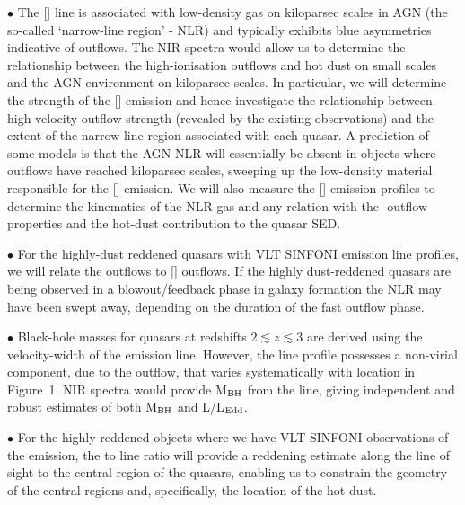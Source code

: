 \vspace{1.5mm}

$\bullet$ The [] line is associated with low-density gas on
kiloparsec scales in AGN (the so-called `narrow-line region' - NLR)
and typically exhibits blue asymmetries indicative of outflows. The
NIR spectra would allow us to determine the relationship between the
high-ionisation outflows and hot dust on small scales and the AGN
environment on kiloparsec scales. In particular, we will determine the
strength of the [] emission and hence investigate the
relationship between high-velocity outflow strength (revealed by the
existing  observations) and the extent of the narrow line
region associated with each quasar. A prediction of some models is
that the AGN NLR will essentially be absent in objects where outflows
have reached kiloparsec scales, sweeping up the low-density material
responsible for the []-emission. We will also measure the
[] emission profiles to determine the kinematics of the NLR
gas and any relation with the -outflow properties and the
hot-dust contribution to the quasar SED.

$\bullet$ For the highly-dust reddened quasars with VLT SINFONI
\ha emission line profiles, we will relate the \ha
outflows to [] outflows. If the highly dust-reddened quasars
are being observed in a blowout/feedback phase in galaxy formation the
NLR may have been swept away, depending on the duration of the fast
outflow phase.

$\bullet$ Black-hole masses for quasars at redshifts $2 \lesssim z
\lesssim 3$ are derived using the velocity-width of the 
emission line. However, the  line profile possesses a
non-virial component, due to the outflow, that varies systematically
with location in Figure~1. NIR spectra would provide M$_{\rm{BH}}$
from the \hb line, giving independent and robust estimates of
both M$_{\rm{BH}}$ and L/L$_{\rm{Edd}}$.

$\bullet$ For the highly reddened objects where we have VLT SINFONI
observations of the \ha emission, the \ha to \hb line
ratio will provide a reddening estimate along the line of sight to the
central region of the quasars, enabling us to constrain the geometry
of the central regions and, specifically, the location of the hot
dust.

